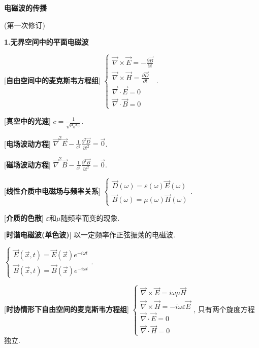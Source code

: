 


 \begin{center} 
 \Large \textbf{电磁波的传播}\par
 (第一次修订)
\end{center}
 
\large 
\begin{center}
 \textbf{1.无界空间中的平面电磁波}
\end{center}

[\textbf{自由空间中的麦克斯韦方程组}] $\begin{cases}\vec\nabla\times\vec E=-\frac{\partial \vec B}{\partial t}\\ \vec\nabla\times\vec H=\frac{\partial\vec D}{\partial t}\\ \vec\nabla\cdot\vec E=0\\\vec\nabla\cdot\vec B=0 \end{cases}$.\par

[\textbf{真空中的光速}] $c=\frac{1}{\sqrt{\mu_0\varepsilon_0}}$.\par

[\textbf{电场波动方程}] $\vec\nabla^2\vec E-\frac{1}{c^2}\frac{\partial^2\vec D}{\partial t^2}=\vec 0$.\par

[\textbf{磁场波动方程}] $\vec\nabla^2\vec B-\frac{1}{c^2}\frac{\partial^2\vec B}{\partial t^2}=\vec 0$.\par

[\textbf{线性介质中电磁场与频率关系}] $\begin{cases}\vec D(\omega)=\varepsilon (\omega)\vec E(\omega)\\\vec B(\omega)=\mu (\omega)\vec H(\omega)\end{cases}$.\par

[\textbf{介质的色散}] $\varepsilon$和$\mu$随频率而变的现象.\par

[\textbf{时谐电磁波(单色波)}] 以一定频率作正弦振荡的电磁波.\par
\qquad $\begin{cases}\vec E(\vec x,t)=\vec E(\vec x)e^{-i\omega t}\\\vec B(\vec x,t)=\vec B(\vec x)e^{-i\omega t}\end{cases}$.\par

[\textbf{时协情形下自由空间的麦克斯韦方程组}] $\begin{cases}\vec\nabla\times\vec E=i\omega\mu\vec H\\\vec\nabla\times\vec H=-i\omega\varepsilon\vec E\\\vec\nabla\cdot\vec E=0\\\vec\nabla\cdot\vec H=0\end{cases}$, 只有两个旋度方程独立.\par


